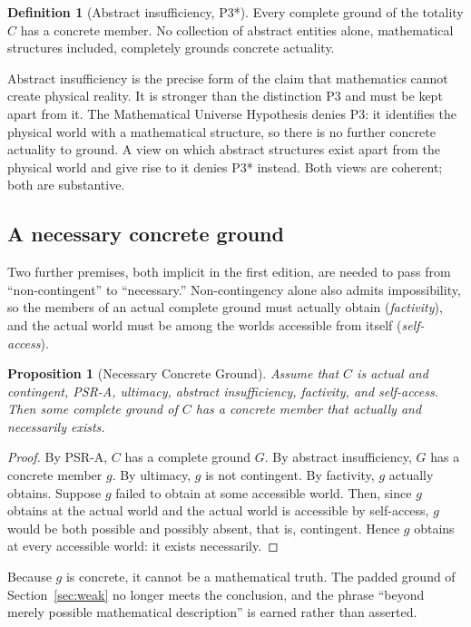\documentclass[11pt,letterpaper]{article}
\theoremstyle{plain}
\newtheorem{proposition}{Proposition}
\theoremstyle{definition}
\newtheorem{definition}{Definition}
\begin{document}
\begin{definition}[Abstract insufficiency, P3*]\label{def:ai}
Every complete ground of the totality $C$ has a concrete member. No collection of abstract entities alone, mathematical structures included, completely grounds concrete actuality.
\end{definition}

Abstract insufficiency is the precise form of the claim that mathematics cannot create physical reality. It is stronger than the distinction P3 and must be kept apart from it. The Mathematical Universe Hypothesis denies P3: it identifies the physical world with a mathematical structure, so there is no further concrete actuality to ground. A view on which abstract structures exist apart from the physical world and give rise to it denies P3* instead. Both views are coherent; both are substantive.

\subsection{A necessary concrete ground}
\label{sec:concrete}

Two further premises, both implicit in the first edition, are needed to pass from ``non-contingent'' to ``necessary.'' Non-contingency alone also admits impossibility, so the members of an actual complete ground must actually obtain (\emph{factivity}), and the actual world must be among the worlds accessible from itself (\emph{self-access}).

\begin{proposition}[Necessary Concrete Ground]\label{prop:concrete}
Assume that $C$ is actual and contingent, PSR-A, ultimacy, abstract insufficiency, factivity, and self-access. Then some complete ground of $C$ has a concrete member that actually and necessarily exists.
\end{proposition}

\begin{proof}
By PSR-A, $C$ has a complete ground $G$. By abstract insufficiency, $G$ has a concrete member $g$. By ultimacy, $g$ is not contingent. By factivity, $g$ actually obtains. Suppose $g$ failed to obtain at some accessible world. Then, since $g$ obtains at the actual world and the actual world is accessible by self-access, $g$ would be both possible and possibly absent, that is, contingent. Hence $g$ obtains at every accessible world: it exists necessarily.
\end{proof}

Because $g$ is concrete, it cannot be a mathematical truth. The padded ground of Section~\ref{sec:weak} no longer meets the conclusion, and the phrase ``beyond merely possible mathematical description'' is earned rather than asserted.
\end{document}
